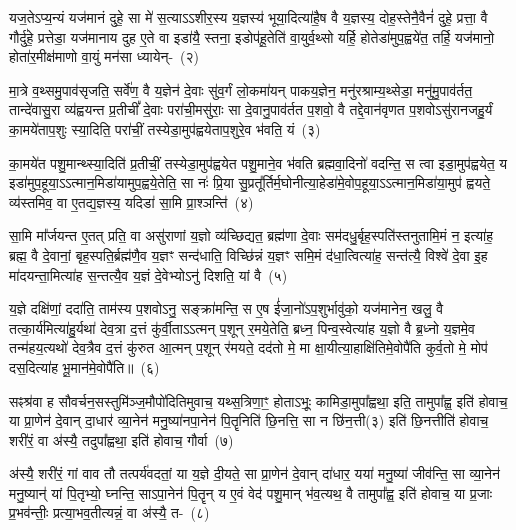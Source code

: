 यज॒ते\-ऽप्य॒न्यं यज॑मानं दुहे॒ सा मे॑ स॒त्या\-ऽऽ\-शीर॒स्य य॒ज्ञस्य॑ भूया॒दित्या॑है॒ष वै य॒ज्ञस्य॒ दोह॒स्तेनै॒वैनं॑ दुहे॒ प्रत्ता॒ वै गौर्दु॑हे॒ प्रत्तेडा॒ यज॑मानाय दुह ए॒ते वा इडा॑यै॒ स्तना॒ इडोप॑हू॒तेति॑ वा॒युर्व॒थ्सो यर्\mbox{}हि॒ होतेडा॑मुप॒ह्वये॑त॒ तर्\mbox{}हि॒ यज॑मानो॒ होता॑र॒मीक्ष॑माणो वा॒युं मन॑सा ध्यायेन्-~(२)\ip

मा॒त्रे व॒थ्समु॒पाव॑सृजति॒ सर्वे॑ण॒ वै य॒ज्ञेन॑ दे॒वाः सु॑व॒र्गं लो॒कमा॑यन् पाकय॒ज्ञेन॒ मनु॑रश्राम्य॒थ्सेडा॒ मनु॑मु॒पाव॑र्तत॒ तान्दे॑वासु॒रा व्य॑ह्वयन्त प्र॒तीचीं᳚ दे॒वाः परा॑ची॒मसु॑राः॒ सा दे॒वानु॒पाव॑र्तत प॒शवो॒ वै तद्दे॒वान॑वृणत प॒शवो\-ऽसु॑रानजहु॒र्यं का॒मये॑ताप॒शुः स्या॒दिति॒ परा॑चीं॒ तस्येडा॒मुप॑ह्वयेताप॒शुरे॒व भ॑वति॒ यं~(३)\ip

का॒मये॑त पशु॒मान्थ्स्या॒दिति॑ प्र॒तीचीं॒ तस्येडा॒मुप॑ह्वयेत पशु॒माने॒व भ॑वति ब्रह्मवा॒दिनो॑ वदन्ति॒ स त्वा इडा॒मुप॑ह्वयेत॒ य इडा॑मुप॒हूया॒\-ऽऽ\-त्मान॒मिडा॑यामुप॒ह्वये॒तेति॒ सा नः॑ प्रि॒या सु॒प्रतू᳚र्तिर्म॒घोनीत्या॒हेडा॑मे॒वोप॒हूया॒\-ऽऽ\-त्मान॒मिडा॑या॒मुप॑ ह्वयते॒ व्य॑स्तमिव॒ वा ए॒तद्य॒ज्ञस्य॒ यदिडा॑ सा॒मि प्रा॒श्ञन्ति॑~(४)\ip

सा॒मि मा᳚र्जयन्त ए॒तत् प्रति॒ वा असु॑राणां य॒ज्ञो व्य॑च्छिद्यत॒ ब्रह्म॑णा दे॒वाः सम॑दधु॒र्बृह॒स्पति॑स्तनुतामि॒मं न॒ इत्या॑ह॒ ब्रह्म॒ वै दे॒वानां॒ बृह॒स्पति॒र्ब्रह्म॑णै॒व य॒ज्ञꣳ सन्द॑धाति॒ विच्छि॑न्नं य॒ज्ञꣳ समि॒मं द॑धा॒त्वित्या॑ह॒ सन्त॑त्यै॒ विश्वे॑ दे॒वा इ॒ह मा॑दयन्ता॒मित्या॑ह स॒न्तत्यै॒व य॒ज्ञं दे॒वेभ्यो\-ऽनु॑ दिशति॒ यां वै~(५)\ip


य॒ज्ञे दक्षि॑णां॒ ददा॑ति॒ ताम॑स्य प॒शवो\-ऽनु॒ सङ्क्रा॑मन्ति॒ स ए॒ष ई॑जा॒नो॑\-ऽप॒शुर्भावु॑को॒ यज॑मानेन॒ खलु॒ वै तत्का॒र्य॑मित्या॑हु॒र्यथा॑ देव॒त्रा द॒त्तं कु॑र्वी॒ता\-ऽऽ\-त्मन् प॒शून् र॒मये॒तेति॒ ब्रध्न॒ पिन्व॒स्वेत्या॑ह य॒ज्ञो वै ब्र॒ध्नो य॒ज्ञमे॒व तन्म॑हय॒त्यथो॑ देव॒त्रैव द॒त्तं कु॑रुत आ॒त्मन् प॒शून् र॑मयते॒ दद॑तो मे॒ मा क्षा॒यीत्या॒हाक्षि॑तिमे॒वोपै॑ति कुर्व॒तो मे॒ मोप॑ दस॒दित्या॑ह भू॒मान॑मे॒वोपै॑ति॥~(६)\ip

{\anuvakamend[{वि॒द्वान्ध्या॑ये॒ द्यं प्रा॒श्ञन्ति॒ यां वै म॒ एका॒न्नविꣳ॑श॒तिश्च॑}]}

सꣴश्र॑वा ह सौवर्चन॒सस्तुमि॑ञ्ज॒मौपो॑दितिमुवाच॒ यथ्स॒त्रिणा॒ꣳ॒ होता\-ऽभूः॒ कामिडा॒मुपा᳚\-ह्वथा॒ इति॒ तामुपा᳚ह्व॒ इति॑ होवाच॒ या प्रा॒णेन॑ दे॒वान् दा॒धार॑ व्या॒नेन॑ मनु॒ष्या॑नपा॒नेन॑ पि॒तॄनिति॑ छि॒नत्ति॒ सा न छि॑न॒त्ती(३) इति॑ छि॒नत्तीति॑ होवाच॒ शरी॑रं॒ वा अ॑स्यै॒ तदुपा᳚ह्वथा॒ इति॑ होवाच॒ गौर्वा~(७)\ip

अ॑स्यै॒ शरी॑रं॒ गां वाव तौ तत्पर्य॑वदतां॒ या य॒ज्ञे दी॒यते॒ सा प्रा॒णेन॑ दे॒वान् दा॑धार॒ यया॑ मनु॒ष्या॑ जीव॑न्ति॒ सा व्या॒नेन॑ मनु॒ष्यान्॑ यां पि॒तृभ्यो॒ घ्नन्ति॒ सा\-ऽपा॒नेन॑ पि॒तॄन् य ए॒वं वेद॑ पशु॒मान् भ॑व॒त्यथ॒ वै तामुपा᳚ह्व॒ इति॑ होवाच॒ या प्र॒जाः प्र॒भव॑न्तीः॒ प्रत्या॒भव॒तीत्यन्नं॒ वा अ॑स्यै॒ त-~(८)\ip

